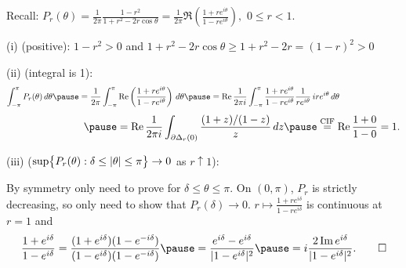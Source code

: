 \documentclass[10pt,aspectratio=169]{beamer}
\begin{document}
\begin{frame}
Recall: $
P_r(\theta)
= \frac{1}{2\pi} \frac{1-r^2}{1+r^2-2r \cos \theta}
= \frac{1}{2\pi}
\Re \left( \frac{1+re^{i\theta}}{1-re^{i\theta}}\right) ,
$
\quad
$0 \leq r < 1$.
\pause
\medskip

(i) (positive): \quad $1-r^2 > 0$
\quad
and
\quad
$1+r^2-2r \cos\theta \geq 1+r^2-2r = {(1-r)}^2 > 0$

\medskip
\pause

(ii) (integral is 1):
\[
\int_{-\pi}^{\pi}
P_r(\theta) \, d\theta
\pause
=
\frac{1}{2\pi}
\int_{-\pi}^{\pi}
\Re
\left(
\frac{1+re^{i\theta}}{1-re^{i\theta}}
\right)
\, d\theta
\pause
=
\Re
\frac{1}{2\pi i}
\int_{-\pi}^{\pi}
\frac{1+re^{i\theta}}{1-re^{i\theta}} \frac{1}{re^{i\theta}} \,
ire^{i\theta}
\, d\theta
\hspace*{1in}
\]
\[
\hspace*{1in}
\pause
= 
\Re
\frac{1}{2\pi i}
\int_{\partial \Delta_r(0)}
\frac{(1+z)/(1-z)}{z} \, dz
\pause
\overset{\text{CIF}}{=}
\Re \frac{1+0}{1-0} = 1 .
\]
\pause

(iii) ($\sup \bigl\{P_r(\theta) : \delta \leq \left\lvert {\theta} \right\rvert \leq
\pi \bigr\} \to 0$ as $r \uparrow 1$):


\pause
By symmetry only need to prove for $\delta \leq \theta \leq \pi$.
\pause
\quad
On $(0,\pi)$, $P_r$ is strictly decreasing, so only need to show
that $P_r(\delta) \to 0$.
\pause
\quad
$r \mapsto
\frac{1+re^{i\delta}}{1-re^{i\delta}}$
is continuous at $r=1$ and \pause
\[
\frac{1+e^{i\delta}}{1-e^{i\delta}}
=
\frac{(1+e^{i\delta})(1-e^{-i\delta})}{(1-e^{i\delta})(1-e^{-i\delta})}
\pause
=
\frac{e^{i\delta}-e^{i\delta}}{\sabs{1-e^{i\delta}}^2}
\pause
=
i \frac{2\Im e^{i\delta}}{\sabs{1-e^{i\delta}}^2} . \qed
\]
\end{frame}
\end{document}
